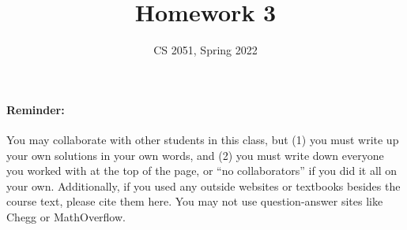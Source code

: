 \documentclass{article}
\begin{document}
\title{Homework 3}
\author{CS 2051, Spring 2022}
\date{}
\maketitle


\paragraph{Reminder:} You may collaborate with other students in this
class, but (1) you must write up your own solutions in your own words, and (2) 
you must write down everyone you worked with at the top of the page, or ``no 
collaborators'' if you did it all on your own. Additionally, if you used any outside websites or textbooks besides the course text, please cite them here. You may not use question-answer sites like Chegg or MathOverflow. \\

\hline
\end{document}
